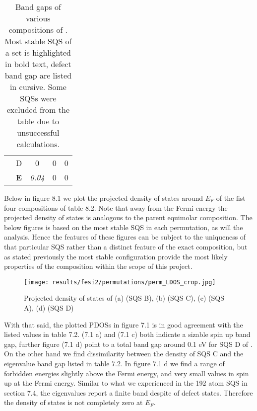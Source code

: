 \begin{table}[]
\begin{tabular}{@{}ccccc@{}}
\multicolumn{1}{c|}{}                                       & D          & 0                                                                           & 0                                                                           & 0                                                                                 \\
\multicolumn{1}{c|}{}                                       & \textbf{E} & \textit{0.04}                                                               & 0                                                                           & 0                                                                                 \\ \bottomrule 
\end{tabular}
\caption{Band gaps of various compositions of . Most stable SQS of a set is highlighted in bold text, defect band gap are listed in cursive. Some SQSs were excluded from the table due to unsuccessful calculations.}
\end{table}

Below in figure 8.1 we plot the projected density of states around $E_F$ of the fist four compositions of table 8.2. Note that away from the Fermi energy the projected density of states is analogous to the parent equimolar composition. The below figures is based on the most stable SQS in each permutation, as will the analysis. Hence the features of these figures can be subject to the uniqueness of that particular SQS rather than a distinct feature of the exact composition, but as stated previously the most stable configuration provide the most likely properties of the composition within the scope of this project. 

\begin{figure}[H]
\texttt{[image: results/fesi2/permutations/perm\_LDOS\_crop.jpg]}
\caption{Projected density of states of (a)  (SQS B), (b)  (SQS C), (c)  (SQS A), (d)  (SQS D)}
\end{figure}

With that said, the plotted PDOSs in figure 7.1 is in good agreement with the listed values in table 7.2.  (7.1 a) and  (7.1 c) both indicate a sizable spin up band gap, further figure (7.1 d) point to a total band gap around 0.1 eV for SQS D of . On the other hand we find dissimilarity between the density of  SQS C and the eigenvalue band gap listed in table 7.2. In figure 7.1 d we find a range of forbidden energies slightly above the Fermi energy, and very small values in spin up at the Fermi energy. Similar to what we experienced in the 192 atom SQS in section 7.4, the eigenvalues report a finite band despite of defect states. Therefore the density of states is not completely zero at $E_F$. 

